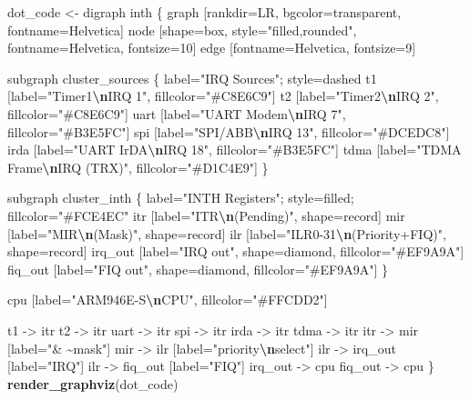 \documentclass[
]{article}
\newenvironment{Shaded}{\begin{snugshade}}{\end{snugshade}}
\newcommand{\FunctionTok}[1]{\textcolor[rgb]{0.13,0.29,0.53}{\textbf{#1}}}
\newcommand{\NormalTok}[1]{#1}
\newcommand{\OtherTok}[1]{\textcolor[rgb]{0.56,0.35,0.01}{#1}}
\newcommand{\SpecialCharTok}[1]{\textcolor[rgb]{0.81,0.36,0.00}{\textbf{#1}}}
\newcommand{\StringTok}[1]{\textcolor[rgb]{0.31,0.60,0.02}{#1}}
\begin{document}
\begin{Shaded}
\begin{Highlighting}[]
\NormalTok{dot\_code }\OtherTok{\textless{}{-}} \StringTok{\textquotesingle{}digraph inth \{}
\StringTok{  graph [rankdir=LR, bgcolor=transparent, fontname=Helvetica]}
\StringTok{  node [shape=box, style="filled,rounded", fontname=Helvetica, fontsize=10]}
\StringTok{  edge [fontname=Helvetica, fontsize=9]}

\StringTok{  subgraph cluster\_sources \{}
\StringTok{    label="IRQ Sources"; style=dashed}
\StringTok{    t1 [label="Timer1}\SpecialCharTok{\textbackslash{}n}\StringTok{IRQ 1", fillcolor="\#C8E6C9"]}
\StringTok{    t2 [label="Timer2}\SpecialCharTok{\textbackslash{}n}\StringTok{IRQ 2", fillcolor="\#C8E6C9"]}
\StringTok{    uart [label="UART Modem}\SpecialCharTok{\textbackslash{}n}\StringTok{IRQ 7", fillcolor="\#B3E5FC"]}
\StringTok{    spi [label="SPI/ABB}\SpecialCharTok{\textbackslash{}n}\StringTok{IRQ 13", fillcolor="\#DCEDC8"]}
\StringTok{    irda [label="UART IrDA}\SpecialCharTok{\textbackslash{}n}\StringTok{IRQ 18", fillcolor="\#B3E5FC"]}
\StringTok{    tdma [label="TDMA Frame}\SpecialCharTok{\textbackslash{}n}\StringTok{IRQ (TRX)", fillcolor="\#D1C4E9"]}
\StringTok{  \}}

\StringTok{  subgraph cluster\_inth \{}
\StringTok{    label="INTH Registers"; style=filled; fillcolor="\#FCE4EC"}
\StringTok{    itr [label="ITR}\SpecialCharTok{\textbackslash{}n}\StringTok{(Pending)", shape=record]}
\StringTok{    mir [label="MIR}\SpecialCharTok{\textbackslash{}n}\StringTok{(Mask)", shape=record]}
\StringTok{    ilr [label="ILR0{-}31}\SpecialCharTok{\textbackslash{}n}\StringTok{(Priority+FIQ)", shape=record]}
\StringTok{    irq\_out [label="IRQ out", shape=diamond, fillcolor="\#EF9A9A"]}
\StringTok{    fiq\_out [label="FIQ out", shape=diamond, fillcolor="\#EF9A9A"]}
\StringTok{  \}}

\StringTok{  cpu [label="ARM946E{-}S}\SpecialCharTok{\textbackslash{}n}\StringTok{CPU", fillcolor="\#FFCDD2"]}

\StringTok{  t1 {-}\textgreater{} itr}
\StringTok{  t2 {-}\textgreater{} itr}
\StringTok{  uart {-}\textgreater{} itr}
\StringTok{  spi {-}\textgreater{} itr}
\StringTok{  irda {-}\textgreater{} itr}
\StringTok{  tdma {-}\textgreater{} itr}
\StringTok{  itr {-}\textgreater{} mir [label="\& \textasciitilde{}mask"]}
\StringTok{  mir {-}\textgreater{} ilr [label="priority}\SpecialCharTok{\textbackslash{}n}\StringTok{select"]}
\StringTok{  ilr {-}\textgreater{} irq\_out [label="IRQ"]}
\StringTok{  ilr {-}\textgreater{} fiq\_out [label="FIQ"]}
\StringTok{  irq\_out {-}\textgreater{} cpu}
\StringTok{  fiq\_out {-}\textgreater{} cpu}
\StringTok{\}\textquotesingle{}}
\FunctionTok{render\_graphviz}\NormalTok{(dot\_code)}
\end{Highlighting}
\end{Shaded}
\end{document}
